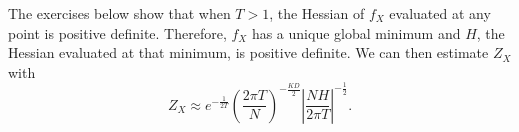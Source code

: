 The exercises below show that when $T > 1$, the Hessian of $f_X$ evaluated at any point is positive definite. Therefore, $f_X$ has a unique global minimum and $H$, the Hessian evaluated at that minimum, is positive definite. We can then estimate $Z_X$ with
%
\begin{equation}
Z_X \approx e^{-\frac{1}{2T}}\left(\frac{2\pi T}{N}\right)^{-\frac{KD}{2}}\left|\frac{NH}{2\pi T}\right|^{-\frac{1}{2}}.
\end{equation}
%

%
%
%
%
